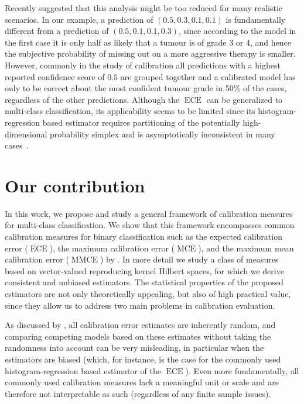 \documentclass{article}
\DeclareMathOperator{\ECE}{ECE}
\DeclareMathOperator{\MCE}{MCE}
\DeclareMathOperator{\MMCE}{MMCE}
\begin{document}
Recently \citet{vaicenavicius19_evaluat} suggested that this analysis might
be too reduced for many realistic scenarios. In our example, a prediction of
$(0.5, 0.3, 0.1, 0.1)$ is fundamentally different from a prediction of
$(0.5, 0.1, 0.1, 0.3)$, since according to the model in the first case it is only
half as likely that a tumour is of grade 3 or 4, and hence the subjective
probability of missing out on a more aggressive therapy is smaller. However,
commonly in the study of calibration all predictions with a highest reported
confidence score of $0.5$ are grouped together and a calibrated model has only to
be correct about the most confident tumour grade in 50\% of the cases, regardless
of the other predictions. Although the $\ECE$ can be generalized to multi-class
classification, its applicability seems to be limited since its
histogram-regression based estimator requires partitioning of the potentially
high-dimensional probability simplex and is asymptotically inconsistent in many
cases~\citep{vaicenavicius19_evaluat}.

\section{Our contribution}

In this work, we propose and study a general framework of calibration measures
for multi-class classification. We show that this framework encompasses common
calibration measures for binary classification such as the expected calibration
error ($\ECE$), the maximum calibration error ($\MCE$), and the maximum mean
calibration error ($\MMCE$) by \citet{kumar18_train_calib_measur_neural_networ}. In
more detail we study a class of measures based on vector-valued reproducing
kernel Hilbert spaces, for which we derive consistent and unbiased estimators.
The statistical properties of the proposed estimators are not only theoretically
appealing, but also of high practical value, since they allow us to address two
main problems in calibration evaluation.

As discussed by \citet{vaicenavicius19_evaluat}, all calibration error
estimates are inherently random, and comparing competing models based on these
estimates without taking the randomness into account can be very misleading, in
particular when the estimators are biased (which, for instance, is the case for
the commonly used histogram-regression based estimator of the $\ECE$). Even more
fundamentally, all commonly used calibration measures lack a meaningful unit or
scale and are therefore not interpretable as such (regardless of any finite
sample issues).
\end{document}
